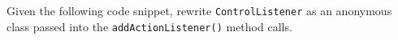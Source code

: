 Given the following code snippet, rewrite \texttt{ControlListener} as an anonymous class passed into the \texttt{addActionListener()} method calls.



\begin{answer}



\end{answer}
